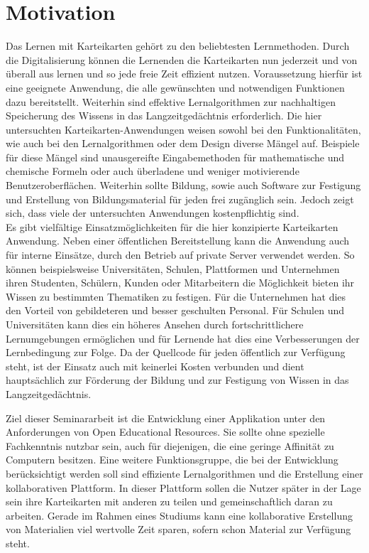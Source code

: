 %
%

\section{Motivation}
Das Lernen mit Karteikarten gehört zu den beliebtesten Lernmethoden. Durch die Digitalisierung können die Lernenden die Karteikarten nun jederzeit und von überall aus lernen und so jede freie Zeit effizient nutzen. Voraussetzung hierfür ist eine geeignete Anwendung, die alle gewünschten und notwendigen Funktionen dazu bereitstellt. Weiterhin sind effektive Lernalgorithmen zur nachhaltigen Speicherung des Wissens in das Langzeitgedächtnis erforderlich. Die hier untersuchten Karteikarten-Anwendungen weisen sowohl bei den Funktionalitäten, wie auch bei den Lernalgorithmen oder dem Design diverse Mängel auf. Beispiele für diese Mängel sind unausgereifte Eingabemethoden für mathematische und chemische Formeln oder auch überladene und weniger motivierende Benutzeroberflächen. Weiterhin sollte Bildung, sowie auch Software zur Festigung und Erstellung von Bildungsmaterial für jeden frei zugänglich sein. Jedoch zeigt sich, dass viele der untersuchten Anwendungen kostenpflichtig sind.\\

Es gibt vielfältige Einsatzmöglichkeiten für die hier konzipierte Karteikarten Anwendung. Neben einer öffentlichen Bereitstellung kann die Anwendung auch für interne Einsätze, durch den Betrieb auf private Server verwendet werden. So können beispielsweise Universitäten, Schulen, Plattformen und Unternehmen ihren Studenten, Schülern, Kunden oder Mitarbeitern die Möglichkeit bieten ihr Wissen zu bestimmten Thematiken zu festigen. Für die Unternehmen hat dies den Vorteil von gebildeteren und besser geschulten Personal. Für Schulen und Universitäten kann dies ein höheres Ansehen durch fortschrittlichere Lernumgebungen ermöglichen und für Lernende hat dies eine Verbesserungen der Lernbedingung zur Folge. Da der Quellcode für jeden öffentlich zur Verfügung steht, ist der Einsatz auch mit keinerlei Kosten verbunden und dient hauptsächlich zur Förderung der Bildung und zur Festigung von Wissen in das Langzeitgedächtnis. 


Ziel dieser Seminararbeit ist die Entwicklung einer Applikation unter den Anforderungen von Open Educational Resources. Sie sollte ohne spezielle Fachkenntnis nutzbar sein, auch für diejenigen, die eine geringe Affinität zu Computern besitzen. Eine weitere Funktionsgruppe, die bei der Entwicklung berücksichtigt werden soll sind effiziente Lernalgorithmen und die Erstellung einer kollaborativen Plattform. In dieser Plattform sollen die Nutzer später in der Lage sein ihre Karteikarten mit anderen zu teilen und gemeinschaftlich daran zu arbeiten. Gerade im Rahmen eines Studiums kann eine kollaborative Erstellung von Materialien viel wertvolle Zeit sparen, sofern schon Material zur Verfügung steht. \\

